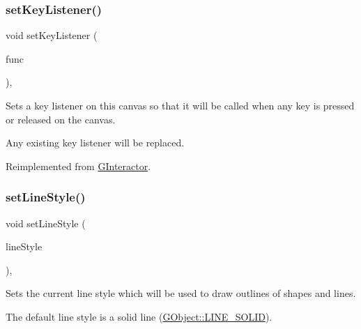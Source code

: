 \subsubsection{\texorpdfstring{set\+Key\+Listener()}{setKeyListener()}\hspace{0.1cm}{\footnotesize\ttfamily [2/2]}}
{\footnotesize\ttfamily void set\+Key\+Listener (\begin{DoxyParamCaption}\item[{\mbox{\hyperlink{namespacesgl_a54427ce97bb1c2804e4fe2b0a62e8b17}{G\+Event\+Listener\+Void}}}]{func }\end{DoxyParamCaption})\hspace{0.3cm}{\ttfamily [override]}, {\ttfamily [virtual]}}



Sets a key listener on this canvas so that it will be called when any key is pressed or released on the canvas. 

Any existing key listener will be replaced. 

Reimplemented from \mbox{\hyperlink{classsgl_1_1GInteractor_ae48ecea73606c7bd9423e1c7cc589cc9}{G\+Interactor}}.

\mbox{\label{classsgl_1_1GDrawingSurface_a6bfe14a77101db0fb97b5a7e07a5526b}} 
\subsubsection{\texorpdfstring{set\+Line\+Style()}{setLineStyle()}}
{\footnotesize\ttfamily void set\+Line\+Style (\begin{DoxyParamCaption}\item[{\mbox{\hyperlink{classsgl_1_1GObject_a86e0f5648542856159bb40775c854aa7}{G\+Object\+::\+Line\+Style}}}]{line\+Style }\end{DoxyParamCaption})\hspace{0.3cm}{\ttfamily [virtual]}, {\ttfamily [inherited]}}



Sets the current line style which will be used to draw outlines of shapes and lines. 

The default line style is a solid line (\mbox{\hyperlink{classsgl_1_1GObject_a86e0f5648542856159bb40775c854aa7a700c78bc2cd76acaab26651bf7b4941f}{G\+Object\+::\+L\+I\+N\+E\+\_\+\+S\+O\+L\+ID}}). \mbox{\label{classsgl_1_1GDrawingSurface_afd6a47c6ea6a1f85ca05a65ba3ff3477}} 

